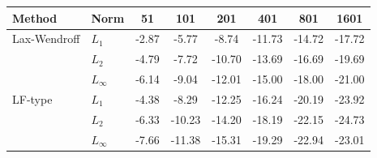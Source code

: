 \begin{tabular}{l l c c c c c c}
\toprule
Method & Norm & 51 & 101 & 201 & 401 & 801 & 1601 \\
\midrule
Lax-Wendroff & $L_1$ & -2.87 & -5.77 & -8.74 & -11.73 & -14.72 & -17.72 \\
 & $L_2$ & -4.79 & -7.72 & -10.70 & -13.69 & -16.69 & -19.69 \\
 & $L_\infty$ & -6.14 & -9.04 & -12.01 & -15.00 & -18.00 & -21.00 \\
\midrule
LF-type & $L_1$ & -4.38 & -8.29 & -12.25 & -16.24 & -20.19 & -23.92 \\
 & $L_2$ & -6.33 & -10.23 & -14.20 & -18.19 & -22.15 & -24.73 \\
 & $L_\infty$ & -7.66 & -11.38 & -15.31 & -19.29 & -22.94 & -23.01 \\
\bottomrule
\end{tabular}